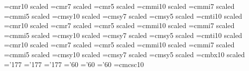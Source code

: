 


\noblackbox
%
%
%
\def\HUTP#1#2{\Title{HUTP-\number\yearltd/A#1}{#2}}
\def\Title#1#2{\ifx\answ\bigans \nopagenumbers
\abstractfont\hsize=\hstitle\rightline{#1}%
\vskip .5in\centerline{\titlefont #2}\abstractfont\vskip .5in\pageno=0
\else \rightline{#1}
\vskip .8in\centerline{\titlefont #2}%
\vskip .5in\pageno=1\fi}
\ifx\answ\bigans
\font\titlerm=cmr10 scaled \font\titlerms=cmr7 scaled
\font\titlermss=cmr5 scaled \font\titlei=cmmi10 scaled
\font\titleis=cmmi7 scaled \font\titleiss=cmmi5 scaled
\font\titlesy=cmsy10 scaled \font\titlesys=cmsy7 scaled
\font\titlesyss=cmsy5 scaled \font\titleit=cmti10 scaled
\else
\font\titlerm=cmr10 scaled \font\titlerms=cmr7 scaled
\font\titlermss=cmr5 scaled \font\titlei=cmmi10 scaled
\font\titleis=cmmi7 scaled \font\titleiss=cmmi5 scaled
\font\titlesy=cmsy10 scaled \font\titlesys=cmsy7 scaled
\font\titlesyss=cmsy5 scaled \font\titleit=cmti10 scaled
\font\absrm=cmr10 scaled \font\absrms=cmr7 scaled
\font\absrmss=cmr5 scaled \font\absi=cmmi10 scaled
\font\absis=cmmi7 scaled \font\absiss=cmmi5 scaled
\font\abssy=cmsy10 scaled \font\abssys=cmsy7 scaled
\font\abssyss=cmsy5 scaled \font\absbf=cmbx10 scaled
\skewchar\absi='177 \skewchar\absis='177 \skewchar\absiss='177
\skewchar\abssy='60 \skewchar\abssys='60 \skewchar\abssyss='60
\fi
%
%
\font\ticp=cmcsc10
\def\hf{{1\over2}}
\def\sq{{\vbox {\hrule height 0.6pt\hbox{\vrule width 0.6pt\hskip 3pt
   \vbox{\vskip 6pt}\hskip 3pt \vrule width 0.6pt}\hrule height 0.6pt}}}
